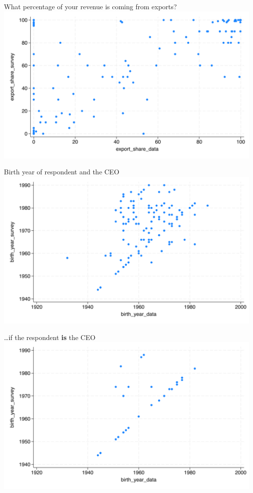 \documentclass[
  ignorenonframetext,
  aspectratio=1610,
]{beamer}
\begin{document}
\begin{frame}{What percentage of your revenue is coming from exports?}
\protect\hypertarget{what-percentage-of-your-revenue-is-coming-from-exports}{}
\includegraphics{fig/export_share_validation.png}
\end{frame}

\begin{frame}{Birth year of respondent and the CEO}
\protect\hypertarget{birth-year-of-respondent-and-the-ceo}{}
\includegraphics{fig/birth_year_validation.png}
\end{frame}

\begin{frame}{\ldots if the respondent \textbf{is} the CEO}
\protect\hypertarget{if-the-respondent-is-the-ceo}{}
\includegraphics{fig/birth_year_validation_cleaned.png}
\end{frame}
\end{document}

